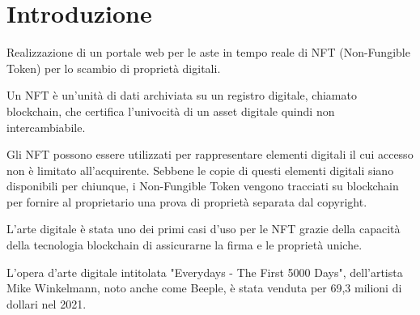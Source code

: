 \section{Introduzione}
Realizzazione di un portale web per le aste in tempo reale di NFT (Non-Fungible Token) per lo scambio di proprietà digitali.

Un NFT è un'unità di dati archiviata su un registro digitale, chiamato blockchain,
che certifica l'univocità di un asset digitale quindi non intercambiabile. \cite{nft1}

Gli NFT possono essere utilizzati per rappresentare elementi digitali il cui accesso non è limitato all'acquirente.
Sebbene le copie di questi elementi digitali siano disponibili per chiunque, 
i Non-Fungible Token vengono tracciati su blockchain per fornire al proprietario una prova di proprietà separata dal copyright. \cite{nft2}

L'arte digitale è stata uno dei primi casi d'uso per le NFT grazie della capacità della tecnologia blockchain di assicurarne la firma e le proprietà uniche.

L'opera d'arte digitale intitolata "Everydays - The First 5000 Days", dell'artista Mike Winkelmann, noto anche come Beeple, 
è stata venduta per 69,3 milioni di dollari nel 2021.\cite{nft3}




